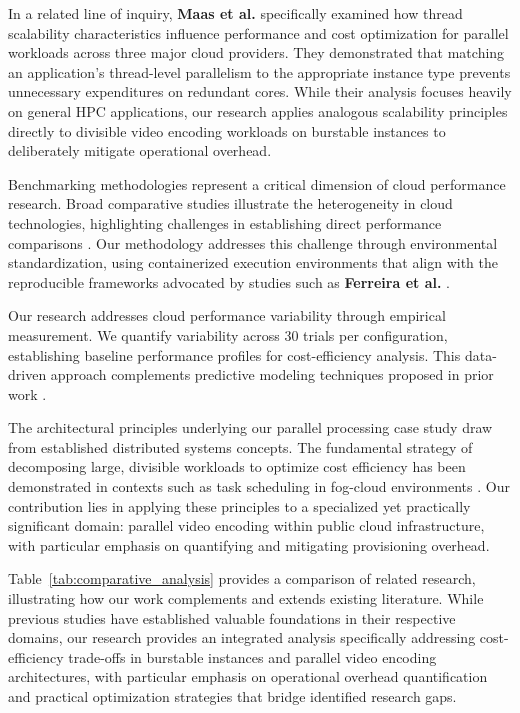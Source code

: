 \documentclass[conference]{IEEEtran}
\begin{document}
	In a related line of inquiry, \textbf{Maas et al.} \cite{b23} specifically examined how thread scalability characteristics influence performance and cost optimization for parallel workloads across three major cloud providers. They demonstrated that matching an application's thread-level parallelism to the appropriate instance type prevents unnecessary expenditures on redundant cores. While their analysis focuses heavily on general HPC applications, our research applies analogous scalability principles directly to divisible video encoding workloads on burstable instances to deliberately mitigate operational overhead.
	
	Benchmarking methodologies represent a critical dimension of cloud performance research. Broad comparative studies illustrate the heterogeneity in cloud technologies, highlighting challenges in establishing direct performance comparisons \cite{b18, b1}. Our methodology addresses this challenge through environmental standardization, using containerized execution environments that align with the reproducible frameworks advocated by studies such as \textbf{Ferreira et al.} \cite{b9}.
	
	Our research addresses cloud performance variability through empirical measurement. We quantify variability across 30 trials per configuration, establishing baseline performance profiles for cost-efficiency analysis. This data-driven approach complements predictive modeling techniques proposed in prior work \cite{b10, b11}.
	
	The architectural principles underlying our parallel processing case study draw from established distributed systems concepts. The fundamental strategy of decomposing large, divisible workloads to optimize cost efficiency has been demonstrated in contexts such as task scheduling in fog-cloud environments \cite{b12, b13}. Our contribution lies in applying these principles to a specialized yet practically significant domain: parallel video encoding within public cloud infrastructure, with particular emphasis on quantifying and mitigating provisioning overhead.
	
	Table~\ref{tab:comparative_analysis} provides a comparison of related research, illustrating how our work complements and extends existing literature. While previous studies have established valuable foundations in their respective domains, our research provides an integrated analysis specifically addressing cost-efficiency trade-offs in burstable instances and parallel video encoding architectures, with particular emphasis on operational overhead quantification and practical optimization strategies that bridge identified research gaps.
	
\end{document}

